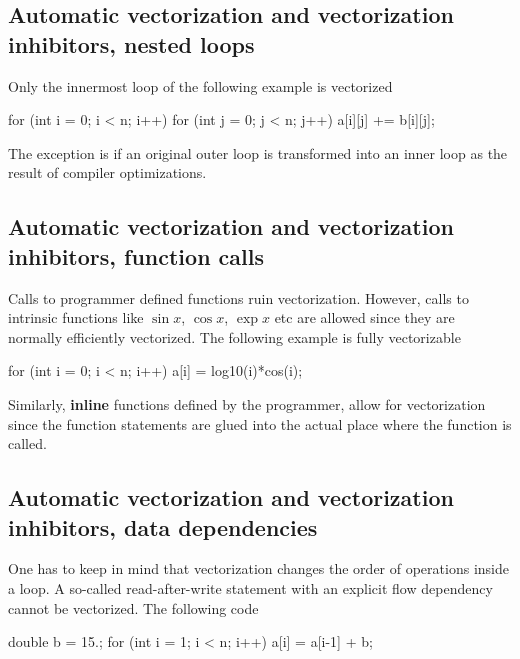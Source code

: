 \documentclass[%
oneside,                 %
final,                   %
10pt]{article}
\begin{document}
\subsection{Automatic vectorization and vectorization inhibitors, nested loops}

Only the innermost loop of the following example is vectorized






\bcppcod
  for (int i = 0; i < n; i++) {
      for (int j = 0; j < n; j++) {
           a[i][j] += b[i][j];
      }  
  }

\ecppcod

The exception is if an original outer loop is transformed into an inner loop as the result of compiler optimizations.

\subsection{Automatic vectorization and vectorization inhibitors, function calls}

Calls to programmer defined functions ruin vectorization. However, calls to intrinsic functions like
$\sin{x}$, $\cos{x}$, $\exp{x}$ etc are allowed since they are normally efficiently vectorized. 
The following example is fully vectorizable




\bcppcod
  for (int i = 0; i < n; i++) {
      a[i] = log10(i)*cos(i);
  }

\ecppcod

Similarly, \textbf{inline} functions defined by the programmer, allow for vectorization since the function statements are glued into the actual place where the function is called. 

\subsection{Automatic vectorization and vectorization inhibitors, data dependencies}

One has to keep in mind that vectorization changes the order of operations inside a loop. A so-called
read-after-write statement with an explicit flow dependency cannot be vectorized. The following code





\bcppcod
  double b = 15.;
  for (int i = 1; i < n; i++) {
      a[i] = a[i-1] + b;
  }
\end{document}
